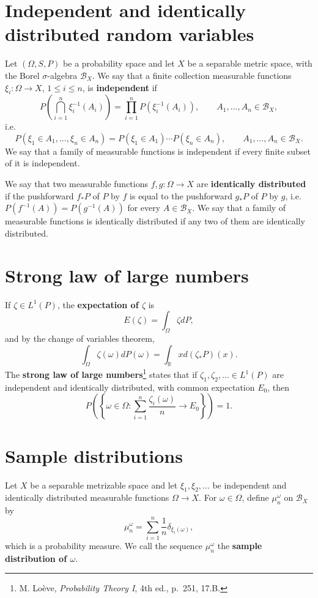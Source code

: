 \documentclass{article}
\theoremstyle{definition}
\begin{document}
\section{Independent and identically distributed random variables}
Let $(\Omega,S,P)$ be a probability space and let $X$ be a separable metric space, with the Borel $\sigma$-algebra $\mathscr{B}_X$.
We say that a finite collection measurable functions $\xi_i: \Omega \to X$, $1 \leq i \leq n$, is \textbf{independent} if
\[
P\left( \bigcap_{i=1}^n \xi_i^{-1}(A_i) \right) = \prod_{i=1}^n P(\xi_i^{-1}(A_i)),
\qquad A_1,\ldots,A_n \in \mathscr{B}_X,
\]
i.e.
\[
P(\xi_1 \in A_1, \ldots, \xi_n \in A_n) = P(\xi_1 \in A_1) \cdots P(\xi_n \in A_n),
\qquad A_1,\ldots,A_n \in \mathscr{B}_X.
\]
We say that a family of measurable functions is independent if every finite subset of it is independent.

We say that two measurable functions $f,g:\Omega \to X$ are \textbf{identically distributed} if the pushforward $f_* P$ of $P$ by $f$
is equal to the pushforward $g_* P$ of $P$ by $g$, i.e. $P(f^{-1}(A)) = P(g^{-1}(A))$ for every $A \in \mathscr{B}_X$. We say that a family of
measurable functions is identically distributed if any two of them are identically distributed.




\section{Strong law of large numbers}
If $\zeta \in L^1(P)$,  
the \textbf{expectation of $\zeta$} is
\[ 
E(\zeta) = \int_\Omega \zeta dP,
\]
and by the change of variables theorem,
\[
\int_\Omega \zeta(\omega) dP(\omega) = \int_{\mathbb{R}} x d(\zeta_* P)(x).
\]
The \textbf{strong law of large numbers}\footnote{M. Lo\`eve, {\em Probability Theory I}, 4th ed.,
p.~251, 17.B.} states that if $\zeta_1,\zeta_2, \ldots \in L^1(P)$ 
are independent and identically distributed, with common expectation $E_0$, then
\[
P\left( \left\{ \omega \in \Omega: \sum_{i=1}^n \frac{\zeta_i(\omega)}{n} \to E_0 \right\} \right) = 1.
\]




\section{Sample distributions}
Let $X$ be a separable metrizable space and let $\xi_1,\xi_2,\ldots$ be independent and identically distributed measurable
functions $\Omega \to X$.
For $\omega \in \Omega$, define $\mu_n^\omega$ on $\mathscr{B}_X$ by
\[
\mu_n^\omega = \sum_{i=1}^n \frac{1}{n} \delta_{\xi_i(\omega)},
\]
which is a probability measure. We call the sequence $\mu_n^\omega$ the \textbf{sample distribution of $\omega$}.
\end{document}
